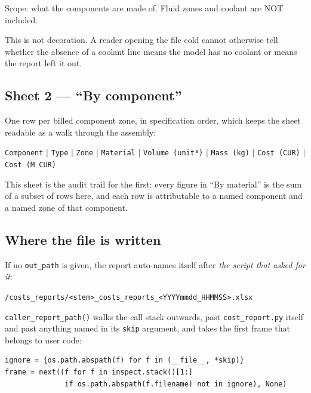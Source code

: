 \documentclass[9pt,a4paper]{extarticle}
\newcommand{\code}[1]{\texttt{\small #1}}
\newcommand{\file}[1]{\texttt{\small #1}}
\begin{document}
\begin{center}\footnotesize\ttfamily
Scope: what the components are made of. Fluid zones and coolant are NOT included.
\end{center}

This is not decoration. A reader opening the file cold cannot otherwise tell
whether the absence of a coolant line means the model has no coolant or means
the report left it out.

\subsection{Sheet 2 --- ``By component''}

One row per billed component zone, in specification order, which keeps the sheet
readable as a walk through the assembly:

\begin{center}\footnotesize
\code{Component} $\mid$ \code{Type} $\mid$ \code{Zone} $\mid$ \code{Material}
$\mid$ \code{Volume (unit³)} $\mid$ \code{Mass (kg)} $\mid$ \code{Cost (CUR)}
$\mid$ \code{Cost (M CUR)}
\end{center}

This sheet is the audit trail for the first: every figure in ``By material'' is
the sum of a subset of rows here, and each row is attributable to a named
component and a named zone of that component.

\subsection{Where the file is written}

If no \code{out\_path} is given, the report auto-names itself after
\emph{the script that asked for it}:

\begin{center}
\file{<dir of that script>/costs\_reports/<stem>\_costs\_reports\_<YYYYmmdd\_HHMMSS>.xlsx}
\end{center}

\code{caller\_report\_path()} walks the call stack outwards, past
\file{cost\_report.py} itself and past anything named in its \code{skip}
argument, and takes the first frame that belongs to user code:

\begin{lstlisting}[style=py]
ignore = {os.path.abspath(f) for f in (__file__, *skip)}
frame = next((f for f in inspect.stack()[1:]
              if os.path.abspath(f.filename) not in ignore), None)
\end{lstlisting}
\end{document}

